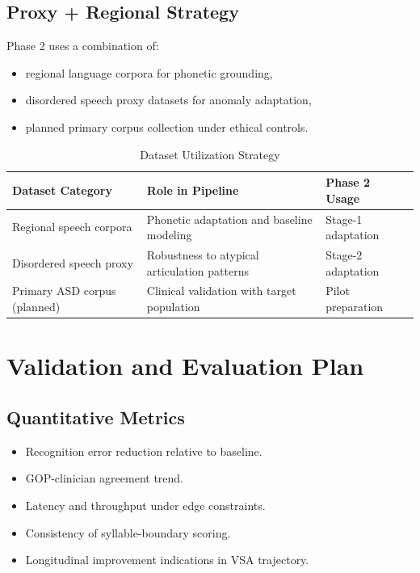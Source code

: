 \documentclass[12pt,a4paper]{article}
\begin{document}
\subsection{Proxy + Regional Strategy}
Phase 2 uses a combination of:
\begin{itemize}[noitemsep,topsep=2pt]
\item regional language corpora for phonetic grounding,
\item disordered speech proxy datasets for anomaly adaptation,
\item planned primary corpus collection under ethical controls.
\end{itemize}

\begin{table}[H]
\centering
\caption{Dataset Utilization Strategy}
\renewcommand{\arraystretch}{1.25}
\begin{tabularx}{\textwidth}{|p{3.5cm}|L|L|}
\hline
\textbf{Dataset Category} & \textbf{Role in Pipeline} & \textbf{Phase 2 Usage} \\
\hline
Regional speech corpora & Phonetic adaptation and baseline modeling & Stage-1 adaptation \\
\hline
Disordered speech proxy & Robustness to atypical articulation patterns & Stage-2 adaptation \\
\hline
Primary ASD corpus (planned) & Clinical validation with target population & Pilot preparation \\
\hline
\end{tabularx}
\end{table}

\section{Validation and Evaluation Plan}
\subsection{Quantitative Metrics}
\begin{itemize}[noitemsep,topsep=2pt]
\item Recognition error reduction relative to baseline.
\item GOP-clinician agreement trend.
\item Latency and throughput under edge constraints.
\item Consistency of syllable-boundary scoring.
\item Longitudinal improvement indications in VSA trajectory.
\end{itemize}
\end{document}

